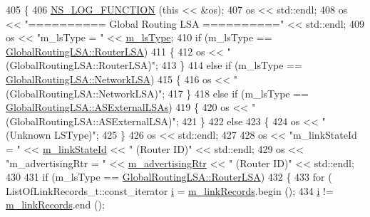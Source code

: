 \begin{DoxyCode}
405 \{
406   \hyperlink{log-macros-disabled_8h_a90b90d5bad1f39cb1b64923ea94c0761}{NS\_LOG\_FUNCTION} (\textcolor{keyword}{this} << &os);
407   os << std::endl;
408   os << \textcolor{stringliteral}{"========== Global Routing LSA =========="} << std::endl;
409   os << \textcolor{stringliteral}{"m\_lsType = "} << \hyperlink{classns3_1_1GlobalRoutingLSA_a9fdb1b0a15b7b25dfb462a6cc0a04d8b}{m\_lsType};
410   \textcolor{keywordflow}{if} (m\_lsType == \hyperlink{classns3_1_1GlobalRoutingLSA_a34eb53a1ed37c877923b74d671224fdeada9e6185a392b3bb450846f5282e415d}{GlobalRoutingLSA::RouterLSA}) 
411     \{
412       os << \textcolor{stringliteral}{" (GlobalRoutingLSA::RouterLSA)"};
413     \}
414   \textcolor{keywordflow}{else} \textcolor{keywordflow}{if} (m\_lsType == \hyperlink{classns3_1_1GlobalRoutingLSA_a34eb53a1ed37c877923b74d671224fdeab37398976cdc8ddd08e1428a4700b5b4}{GlobalRoutingLSA::NetworkLSA}) 
415     \{
416       os << \textcolor{stringliteral}{" (GlobalRoutingLSA::NetworkLSA)"};
417     \}
418   \textcolor{keywordflow}{else} \textcolor{keywordflow}{if} (m\_lsType == \hyperlink{classns3_1_1GlobalRoutingLSA_a34eb53a1ed37c877923b74d671224fdea695b98ad474baaa5f11ff5bb06048ec7}{GlobalRoutingLSA::ASExternalLSAs})
419     \{
420       os << \textcolor{stringliteral}{" (GlobalRoutingLSA::ASExternalLSA)"};
421     \}
422   \textcolor{keywordflow}{else}
423     \{
424       os << \textcolor{stringliteral}{"(Unknown LSType)"};
425     \}
426   os << std::endl;
427 
428   os << \textcolor{stringliteral}{"m\_linkStateId = "} << \hyperlink{classns3_1_1GlobalRoutingLSA_a39580ef7a79397ef08b0480e1a606e7a}{m\_linkStateId} << \textcolor{stringliteral}{" (Router ID)"} << std::endl;
429   os << \textcolor{stringliteral}{"m\_advertisingRtr = "} << \hyperlink{classns3_1_1GlobalRoutingLSA_a8eeb49a0e1c50afed4c016caa8f1c582}{m\_advertisingRtr} << \textcolor{stringliteral}{" (Router ID)"} << std::endl;
430 
431   \textcolor{keywordflow}{if} (m\_lsType == \hyperlink{classns3_1_1GlobalRoutingLSA_a34eb53a1ed37c877923b74d671224fdeada9e6185a392b3bb450846f5282e415d}{GlobalRoutingLSA::RouterLSA}) 
432     \{
433       \textcolor{keywordflow}{for} ( ListOfLinkRecords\_t::const\_iterator \hyperlink{bernuolliDistribution_8m_a6f6ccfcf58b31cb6412107d9d5281426}{i} = \hyperlink{classns3_1_1GlobalRoutingLSA_a67b7b857643304afcd395debe0498363}{m\_linkRecords}.begin ();
434             \hyperlink{bernuolliDistribution_8m_a6f6ccfcf58b31cb6412107d9d5281426}{i} != \hyperlink{classns3_1_1GlobalRoutingLSA_a67b7b857643304afcd395debe0498363}{m\_linkRecords}.end (); 

\end{DoxyCode}
